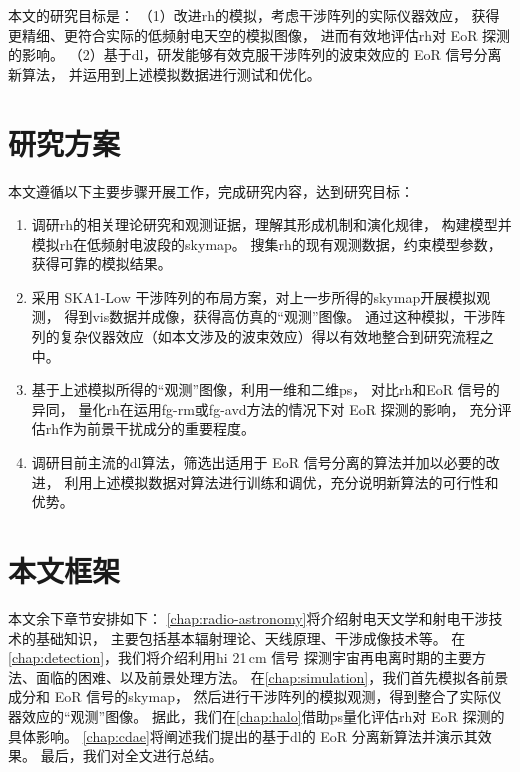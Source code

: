 本文的研究目标是：
（1）改进\ac{rh}的模拟，考虑干涉阵列的实际仪器效应，
获得更精细、更符合实际的低频射电天空的模拟图像，
进而有效地评估\ac{rh}对 EoR 探测的影响。
（2）基于\ac{dl}，研发能够有效克服干涉阵列的波束效应的 EoR 信号分离新算法，
并运用到上述模拟数据进行测试和优化。


\section{研究方案}

本文遵循以下主要步骤开展工作，完成研究内容，达到研究目标：
\begin{enumerate}
\item
调研\ac{rh}的相关理论研究和观测证据，理解其形成机制和演化规律，
构建模型并模拟\ac{rh}在低频射电波段的\ac{skymap}。
搜集\ac{rh}的现有观测数据，约束模型参数，获得可靠的模拟结果。

\item
采用 SKA1-Low 干涉阵列的布局方案，对上一步所得的\ac{skymap}开展模拟观测，
得到\ac{vis}数据并成像，获得高仿真的\enquote{观测}图像。
通过这种模拟，干涉阵列的复杂仪器效应（如本文涉及的波束效应）得以有效地整合到研究流程之中。

\item
基于上述模拟所得的\enquote{观测}图像，利用一维和二维\ac{ps}，
对比\ac{rh}和EoR 信号的异同，
量化\ac{rh}在运用\ac{fg-rm}或\ac{fg-avd}方法的情况下对 EoR 探测的影响，
充分评估\ac{rh}作为前景干扰成分的重要程度。

\item
调研目前主流的\ac{dl}算法，筛选出适用于 EoR 信号分离的算法并加以必要的改进，
利用上述模拟数据对算法进行训练和调优，充分说明新算法的可行性和优势。

\end{enumerate}


\section{本文框架}

本文余下章节安排如下：
\autoref{chap:radio-astronomy}将介绍射电天文学和射电干涉技术的基础知识，
主要包括基本辐射理论、天线原理、干涉成像技术等。
在\autoref{chap:detection}，我们将介绍利用\ac{hi} 21\,cm 信号
探测宇宙再电离时期的主要方法、面临的困难、以及前景处理方法。
在\autoref{chap:simulation}，我们首先模拟各前景成分和 EoR 信号的\ac{skymap}，
然后进行干涉阵列的模拟观测，得到整合了实际仪器效应的\enquote{观测}图像。
据此，我们在\autoref{chap:halo}借助\ac{ps}量化评估\ac{rh}对
EoR 探测的具体影响。
\autoref{chap:cdae}将阐述我们提出的基于\ac{dl}的 EoR 分离新算法并演示其效果。
最后，我们对全文进行总结。

